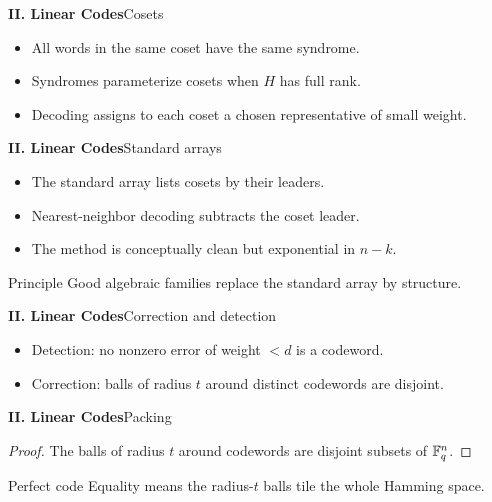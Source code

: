 \begin{frame}{\textbf{II. Linear Codes}}{Cosets}
\small
{}
\begin{itemize}
  \item All words in the same coset have the same syndrome.
  \item Syndromes parameterize cosets when $H$ has full rank.
  \item Decoding assigns to each coset a chosen representative of small weight.
\end{itemize}
\end{frame}

\begin{frame}{\textbf{II. Linear Codes}}{Standard arrays}
\small
{}
\begin{itemize}
  \item The standard array lists cosets by their leaders.
  \item Nearest-neighbor decoding subtracts the coset leader.
  \item The method is conceptually clean but exponential in $n-k$.
\end{itemize}
\begin{block}{Principle}
Good algebraic families replace the standard array by structure.
\end{block}
\end{frame}

\begin{frame}{\textbf{II. Linear Codes}}{Correction and detection}
\small
{}
\begin{itemize}
  \item Detection: no nonzero error of weight $<d$ is a codeword.
  \item Correction: balls of radius $t$ around distinct codewords are disjoint.
\end{itemize}
\end{frame}

\begin{frame}{\textbf{II. Linear Codes}}{Packing}
\small
{}
\begin{proof}
The balls of radius $t$ around codewords are disjoint subsets of $\mathbb{F}_q^n$.
\end{proof}
\begin{block}{Perfect code}
Equality means the radius-$t$ balls tile the whole Hamming space.
\end{block}
\end{frame}

